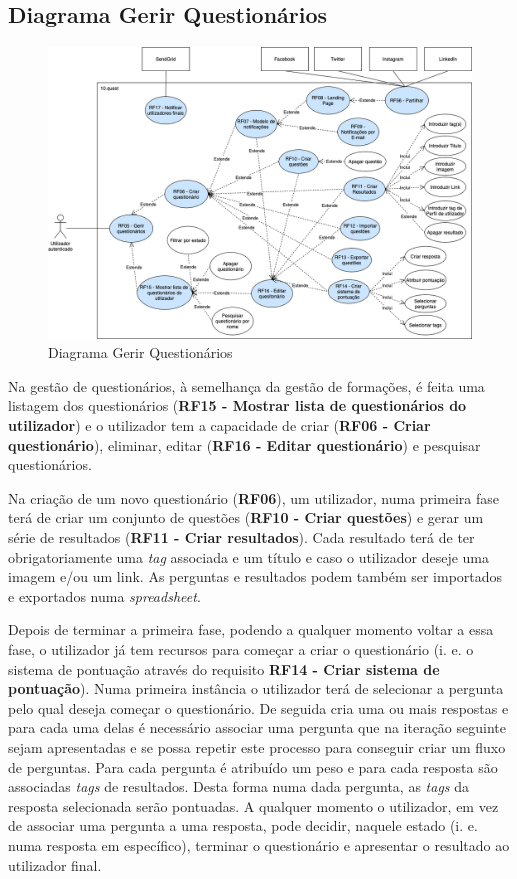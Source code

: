 \subsection{Diagrama Gerir Questionários}
\label{d:quests}
\begin{figure}[ht!]
	\begin{center}
		\includegraphics[width=1\textwidth]{img/rf/gerir-quest}
		\caption{Diagrama Gerir Questionários}
		\label{fig:rf-gerir-quest}
	\end{center}
\end{figure}

Na gestão de questionários, à semelhança da gestão de formações, é feita uma listagem dos questionários (\textbf{RF15 - Mostrar lista de questionários do utilizador}) e o utilizador tem a capacidade de criar (\textbf{RF06 - Criar questionário}), eliminar, editar (\textbf{RF16 - Editar questionário}) e pesquisar questionários.

Na criação de um novo questionário (\textbf{RF06}), um utilizador, numa primeira fase terá de criar um conjunto de questões (\textbf{RF10 - Criar questões}) e gerar um série de resultados (\textbf{RF11 - Criar resultados}). Cada resultado terá de ter obrigatoriamente uma \textit{tag} associada e um título e caso o utilizador deseje uma imagem e/ou um link. As perguntas e resultados podem também ser importados e exportados numa \textit{spreadsheet}.

Depois de terminar a primeira fase, podendo a qualquer momento voltar a essa fase, o utilizador já tem recursos para começar a criar o questionário (i. e. o sistema de pontuação através do requisito \textbf{RF14 - Criar sistema de pontuação}). Numa primeira instância o utilizador terá de selecionar a pergunta pelo qual deseja começar o questionário. De seguida cria uma ou mais respostas e para cada uma delas é necessário associar uma pergunta que na iteração seguinte sejam apresentadas e se possa repetir este processo para conseguir criar um fluxo de perguntas. Para cada pergunta é atribuído um peso e para cada resposta são associadas \textit{tags} de resultados. Desta forma numa dada pergunta, as \textit{tags} da resposta selecionada serão pontuadas. A qualquer momento o utilizador, em vez de associar uma pergunta a uma resposta, pode decidir, naquele estado (i. e. numa resposta em específico), terminar o questionário e apresentar o resultado ao utilizador final.

